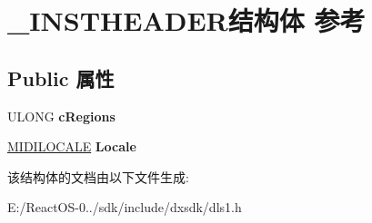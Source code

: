 \hypertarget{struct___i_n_s_t_h_e_a_d_e_r}{}\section{\+\_\+\+I\+N\+S\+T\+H\+E\+A\+D\+E\+R结构体 参考}
\label{struct___i_n_s_t_h_e_a_d_e_r}
\subsection*{Public 属性}
\begin{DoxyCompactItemize}
\item 
\mbox{\label{struct___i_n_s_t_h_e_a_d_e_r_a98e9aeec4afa1f6c48cd3ac8538e1e47}} 
U\+L\+O\+NG {\bfseries c\+Regions}
\item 
\mbox{\label{struct___i_n_s_t_h_e_a_d_e_r_a8637733dfacdd76d11e900b25f259c27}} 
\hyperlink{struct___m_i_d_i_l_o_c_a_l_e}{M\+I\+D\+I\+L\+O\+C\+A\+LE} {\bfseries Locale}
\end{DoxyCompactItemize}


该结构体的文档由以下文件生成\+:\begin{DoxyCompactItemize}
\item 
E\+:/\+React\+O\+S-\/0../sdk/include/dxsdk/dls1.\+h\end{DoxyCompactItemize}
